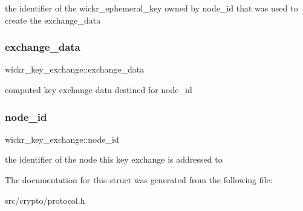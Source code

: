 the identifier of the \textquotesingle{}wickr\+\_\+ephemeral\+\_\+key\textquotesingle{} owned by \textquotesingle{}node\+\_\+id\textquotesingle{} that was used to create the \textquotesingle{}exchange\+\_\+data\textquotesingle{} \mbox{\label{structwickr__key__exchange_a6be89562df814a32b19cd57c49037691}} 
\subsubsection{\texorpdfstring{exchange\+\_\+data}{exchange\_data}}
{\footnotesize\ttfamily wickr\+\_\+key\+\_\+exchange\+::exchange\+\_\+data}

computed key exchange data destined for \textquotesingle{}node\+\_\+id\textquotesingle{} \mbox{\label{structwickr__key__exchange_ad5b271c9c3cf2043ec85dbb40c51fec6}} 
\subsubsection{\texorpdfstring{node\+\_\+id}{node\_id}}
{\footnotesize\ttfamily wickr\+\_\+key\+\_\+exchange\+::node\+\_\+id}

the identifier of the node this key exchange is addressed to 

The documentation for this struct was generated from the following file\+:\begin{DoxyCompactItemize}
\item 
src/crypto/protocol.\+h\end{DoxyCompactItemize}
